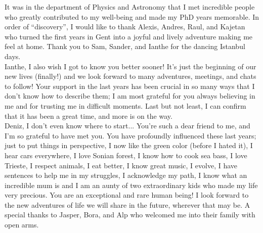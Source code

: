 \begin{acknowledgements}
It was in the department of Physics and Astronomy that I met incredible people who greatly contributed to my well-being and made my PhD years memorable.  In order of ``discovery'', I would like to thank Alexis, Andres, Raul, and Kajetan who turned the first years in Gent into a joyful and lively adventure making me feel at home. Thank you to Sam, Sander, and Ianthe for the dancing Istanbul days. \\
Ianthe, I also wish I got to know you better sooner! It's just the beginning of our new lives (finally!) and we look forward to many adventures, meetings, and chats to follow! Your support in the last years has been crucial in so many ways that I don't know how to describe them; I am most grateful for you always believing in me and for trusting me in difficult moments. Last but not least, I can confirm that it has been a great time, and more is on the way. \\
Deniz, I don't even know where to start... You're such a dear friend to me, and I'm so grateful to have met you. You have profoundly influenced these last years; just to put things in perspective, I now like the green color (before I hated it), I hear cars everywhere, I love Sonian forest, I know how to cook sea bass, I love Trieste, I respect animals, I eat better, I know great music, I evolve, I have sentences to help me in my struggles, I acknowledge my path, I know what an incredible mum is and I am an aunty of two extraordinary kids who made my life very precious. You are an exceptional and rare human being! I look forward to the new adventures of life we will share in the future, wherever that may be. A special thanks to Jasper, Bora, and Alp who welcomed me into their family with open arms.\\


\end{acknowledgements}
